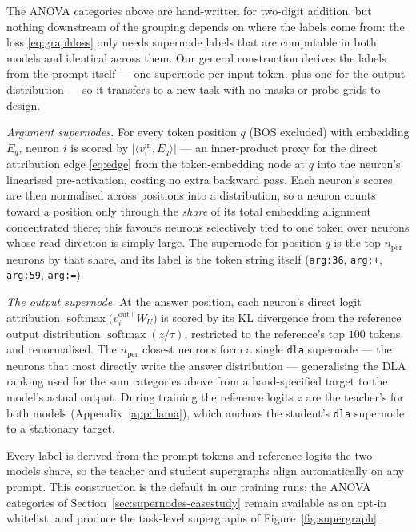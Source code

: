 \documentclass{article}
\DeclareMathOperator{\softmax}{softmax}
\begin{document}
The ANOVA categories above are hand-written for two-digit addition, but nothing downstream of the
grouping depends on where the labels come from: the loss \eqref{eq:graphloss} only needs supernode
labels that are computable in both models and identical across them. Our general construction
derives the labels from the prompt itself --- one supernode per input token, plus one for the
output distribution --- so it transfers to a new task with no masks or probe grids to design.

\emph{Argument supernodes.} For every token position $q$ (BOS excluded) with embedding $E_q$,
neuron $i$ is scored by $\bigl|\langle v^{\mathrm{in}}_i, E_q\rangle\bigr|$ --- an inner-product
proxy for the direct attribution edge \eqref{eq:edge} from the token-embedding node at $q$ into the
neuron's linearised pre-activation, costing no extra backward pass. Each neuron's scores are then
normalised across positions into a distribution, so a neuron counts toward a position only through
the \emph{share} of its total embedding alignment concentrated there; this favours neurons
selectively tied to one token over neurons whose read direction is simply large. The supernode for
position $q$ is the top $n_{\mathrm{per}}$ neurons by that share, and its label is the token string
itself (\texttt{arg:36}, \texttt{arg:+}, \texttt{arg:59}, \texttt{arg:=}).

\emph{The output supernode.} At the answer position, each neuron's direct logit attribution
$\softmax\bigl(v^{\mathrm{out}\top}_i W_U\bigr)$ is scored by its KL divergence from the reference
output distribution $\softmax(z/\tau)$, restricted to the reference's top $100$ tokens and
renormalised. The $n_{\mathrm{per}}$ closest neurons form a single \texttt{dla} supernode --- the
neurons that most directly write the answer distribution --- generalising the DLA ranking used for
the sum categories above from a hand-specified target to the model's actual output. During
training the reference logits $z$ are the teacher's for both models (Appendix~\ref{app:llama}),
which anchors the student's \texttt{dla} supernode to a stationary target.

Every label is derived from the prompt tokens and reference logits the two models share, so the
teacher and student supergraphs align automatically on any prompt. This construction is the default
in our training runs; the ANOVA categories of Section~\ref{sec:supernodes-casestudy} remain
available as an opt-in whitelist, and produce the task-level supergraphs of
Figure~\ref{fig:supergraph}.
\end{document}
